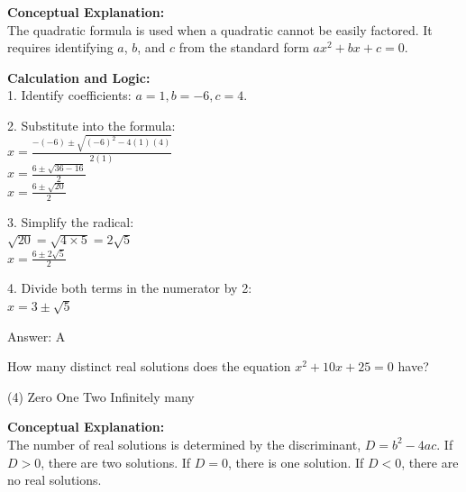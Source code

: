 \documentclass[11pt,paper=a4,answers]{exam}
\begin{document}
\begin{questions}
\begin{solution}
\textbf{Conceptual Explanation:} \\
The quadratic formula is used when a quadratic cannot be easily factored. It requires identifying $a$, $b$, and $c$ from the standard form $ax^2 + bx + c = 0$.

\vspace{15pt}

\textbf{Calculation and Logic:} \\
1. Identify coefficients: $a = 1, b = -6, c = 4$.

\vspace{10pt}

2. Substitute into the formula: \\
   $x = \frac{-(-6) \pm \sqrt{(-6)^2 - 4(1)(4)}}{2(1)}$ \\
   $x = \frac{6 \pm \sqrt{36 - 16}}{2}$ \\
   $x = \frac{6 \pm \sqrt{20}}{2}$

\vspace{10pt}

3. Simplify the radical: \\
   $\sqrt{20} = \sqrt{4 \times 5} = 2\sqrt{5}$ \\
   $x = \frac{6 \pm 2\sqrt{5}}{2}$

\vspace{10pt}

4. Divide both terms in the numerator by 2: \\
   $x = 3 \pm \sqrt{5}$

\vspace{20pt}

Answer: \colorbox{yellow!100}{A}
\end{solution}

\vspace{30pt}

\question
How many distinct real solutions does the equation $x^2 + 10x + 25 = 0$ have?
\begin{tasks}(4)
    \task Zero
    \task One
    \task Two
    \task Infinitely many
\end{tasks}

\begin{solution}
\textbf{Conceptual Explanation:} \\
The number of real solutions is determined by the discriminant, $D = b^2 - 4ac$.
If $D > 0$, there are two solutions. 
If $D = 0$, there is one solution. 
If $D < 0$, there are no real solutions.


\end{solution}
\end{questions}
\end{document}
